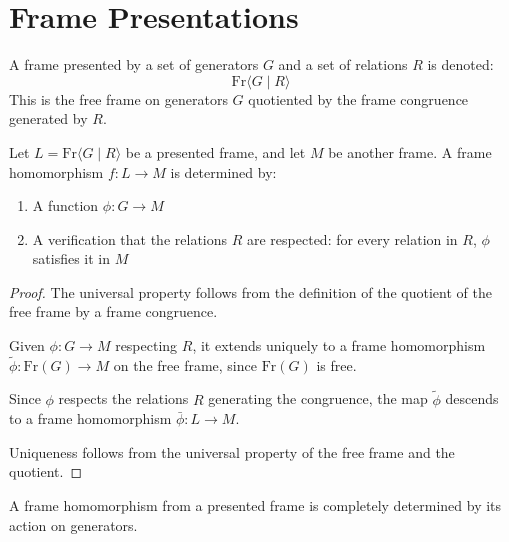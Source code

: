 \section{Frame Presentations}

\begin{definition}
  \label{def:presented-frame}
  A frame presented by a set of generators $G$ and a set of relations $R$ is denoted:
  $$\mathrm{Fr}\langle G \mid R \rangle$$
  This is the free frame on generators $G$ quotiented by the frame congruence generated by $R$.
\end{definition}

\begin{lemma}
  \label{lemma:universal-property-presented-frame}
  Let $L = \mathrm{Fr}\langle G \mid R \rangle$ be a presented frame, and let $M$ be another frame.
  A frame homomorphism $f: L \to M$ is determined by:
  \begin{enumerate}
    \item A function $\phi: G \to M$
    \item A verification that the relations $R$ are respected: for every relation in $R$, $\phi$ satisfies it in $M$
  \end{enumerate}
\end{lemma}

\begin{proof}
  The universal property follows from the definition of the quotient of the free frame by a frame congruence.

  Given $\phi: G \to M$ respecting $R$, it extends uniquely to a frame homomorphism $\tilde{\phi}: \mathrm{Fr}(G) \to M$ on the free frame, since $\mathrm{Fr}(G)$ is free.

  Since $\phi$ respects the relations $R$ generating the congruence, the map $\tilde{\phi}$ descends to a frame homomorphism $\bar{\phi}: L \to M$.

  Uniqueness follows from the universal property of the free frame and the quotient.
\end{proof}

\begin{corollary}
  \label{cor:characterization-presented-frame}
  A frame homomorphism from a presented frame is completely determined by its action on generators.
\end{corollary}

